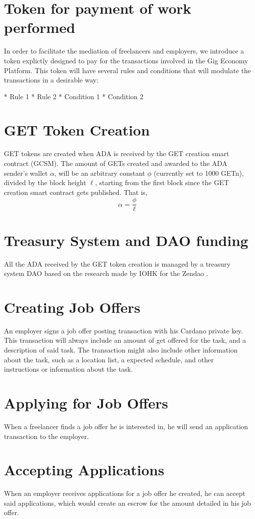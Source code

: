 \documentclass{article}
\begin{document}
\section{Token for payment of work performed}
In order to facilitate the mediation of freelancers and employers, we introduce a token explictly designed to pay for the transactions involved in the Gig Economy Platform. This token will have several rules and conditions that will modulate the transactions in a desirable way:

* Rule 1
* Rule 2
* Condition 1
* Condition 2

\section{GET Token Creation}
GET tokens are created when ADA is received by the GET creation smart contract (GCSM).
The amount of GETs created and awarded to the ADA sender's wallet $\alpha$, will be an arbitrary constant $\phi$ (currently set to 1000 GETn), divided by the block height $\ell$, starting from the first block since the GET creation smart contract gets published. That is,
\[ \alpha
  = \dfrac{\phi}{\ell}
\]

\section{Treasury System and DAO funding}
All the ADA received by the GET token creation is managed by a treasury system DAO based on the research made by IOHK for the Zendao \cite{zhangb2}.
 
\section{Creating Job Offers}
An employer signs a job offer posting transaction with his Cardano private key. This transaction will always include an amount of get offered for the task, and a description of said task. The transaction might also include other information about the task, such as a location list, a expected schedule, and other instructions or information about the task.

\section{Applying for Job Offers}
When a freelancer finds a job offer he is interested in, he will send an application transaction to the employer.

\section{Accepting Applications}
When an employer receives applications for a job offer he created, he can accept said applications, which would create an escrow for the amount detailed in his job offer.
\end{document}
